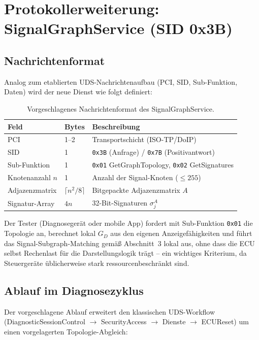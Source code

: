 ﻿\documentclass[a4paper,12pt]{article}
\theoremstyle{definition}
\begin{document}
\section{Protokollerweiterung: SignalGraphService (SID 0x3B)}

\subsection{Nachrichtenformat}

Analog zum etablierten UDS-Nachrichtenaufbau (PCI, SID, Sub-Funktion, Daten) wird der neue Dienst wie folgt definiert:

\begin{table}[h]
\centering
\small
\begin{tabular}{@{}lll@{}}
\toprule
Feld & Bytes & Beschreibung \\
\midrule
PCI & 1--2 & Transportschicht (ISO-TP/DoIP) \\
SID & 1 & \texttt{0x3B} (Anfrage) / \texttt{0x7B} (Positivantwort) \\
Sub-Funktion & 1 & \texttt{0x01} GetGraphTopology, \texttt{0x02} GetSignatures \\
Knotenanzahl $n$ & 1 & Anzahl der Signal-Knoten ($\leq 255$) \\
Adjazenzmatrix & $\lceil n^2/8 \rceil$ & Bitgepackte Adjazenzmatrix $A$ \\
Signatur-Array & $4n$ & 32-Bit-Signaturen $\sigma_j^A$ \\
\bottomrule
\end{tabular}
\caption{Vorgeschlagenes Nachrichtenformat des SignalGraphService.}
\label{tab:format}
\end{table}

Der Tester (Diagnosegerät oder mobile App) fordert mit Sub-Funktion \texttt{0x01} die Topologie an, berechnet lokal $G_D$ aus den eigenen Anzeigefähigkeiten und führt das Signal-Subgraph-Matching gemäß Abschnitt~3 lokal aus, ohne dass die ECU selbst Rechenlast für die Darstellungslogik trägt -- ein wichtiges Kriterium, da Steuergeräte üblicherweise stark ressourcenbeschränkt sind.

\subsection{Ablauf im Diagnosezyklus}

Der vorgeschlagene Ablauf erweitert den klassischen UDS-Workflow (DiagnosticSessionControl $\to$ SecurityAccess $\to$ Dienste $\to$ ECUReset) um einen vorgelagerten Topologie-Abgleich:
\end{document}

